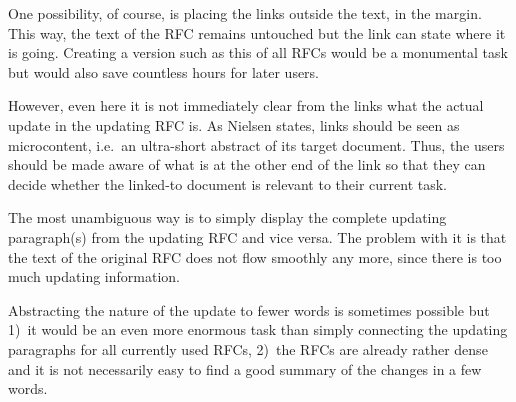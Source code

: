 One possibility, of course, is placing the links outside the text, in
the margin. This way, the text of the RFC remains untouched but
the link can state where it is going.
Creating a version such as this of all RFCs would be a monumental task
but would also save countless hours for later users.



However, even here it is not immediately clear from the links what
the actual update in the updating RFC is. 
As Nielsen
states\cite{nielsen-links-as-microcontent},
links should be seen as microcontent, i.e.~an
ultra-short abstract of its target document. Thus, the users should
be made aware of what is at the other end of the link 
so that they can decide whether the linked-to document is
relevant to their current task.

The most unambiguous way is to simply display the complete
updating paragraph(s) from the updating RFC and vice versa.
The problem with 
it is that the text of the
original RFC does not flow smoothly any more, since there is
too much updating information. 

Abstracting the nature of the update to fewer words is sometimes
possible but 1)~it would be an even more enormous task than simply
connecting the updating paragraphs for all currently used RFCs,
2)~the RFCs are already rather dense and it is not necessarily 
easy to find a good summary of the changes in a few words.


